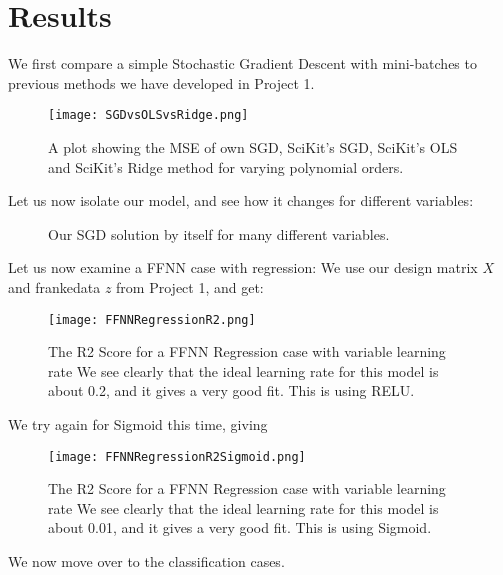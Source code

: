 \documentclass{article}
\begin{document}
\section{Results}
We first compare a simple Stochastic Gradient Descent with mini-batches to previous methods we have developed in Project 1.
\begin{figure}[ht!]
    \centering
    \texttt{[image: SGDvsOLSvsRidge.png]}
    \caption{A plot showing the MSE of own SGD, SciKit's SGD, SciKit's OLS and SciKit's Ridge method for varying polynomial orders.}
    \label{fig3}
\end{figure}
\newpage
Let us now isolate our model, and see how it changes for different variables:
\begin{figure}[ht!]
\centering
{}
\newline
{}

\caption{Our SGD solution by itself for many different variables.}
\end{figure} \newpage
Let us now examine a FFNN case with regression: \newline
We use our design matrix $X$ and frankedata $z$ from Project 1, and get:
\begin{figure}[ht!]
    \centering
    \texttt{[image: FFNNRegressionR2.png]}
    \caption{The R2 Score for a FFNN Regression case with variable learning rate \newline We see clearly that the ideal learning rate for this model is about 0.2, and it gives a very good fit. This is using RELU.}
    \label{fig4}
\end{figure}
\newline
We try again for Sigmoid this time, giving
\begin{figure}[ht!]
    \centering
    \texttt{[image: FFNNRegressionR2Sigmoid.png]}
    \caption{The R2 Score for a FFNN Regression case with variable learning rate \newline We see clearly that the ideal learning rate for this model is about 0.01, and it gives a very good fit. This is using Sigmoid.}
    \label{fig4}
\end{figure}
\newpage
We now move over to the classification cases. \newline
\end{document}
